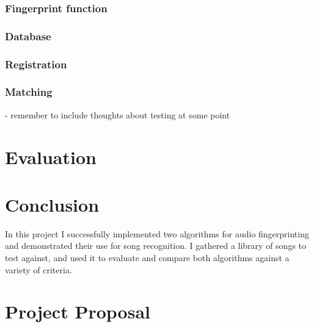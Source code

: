 \documentclass[12pt,a4paper,twoside,openright]{report}
\begin{document}
\subsection{Fingerprint function}
\subsection{Database}
\subsection{Registration}
\subsection{Matching}





- remember to include thoughts about testing at some point


\chapter{Evaluation}



\chapter{Conclusion}

In this project I successfully implemented two algorithms for audio fingerprinting and demonstrated their use for song recognition. I gathered a library of songs to test against, and used it to evaluate and compare both algorithms against a variety of criteria.






\appendix


\chapter{Project Proposal}


\end{document}
